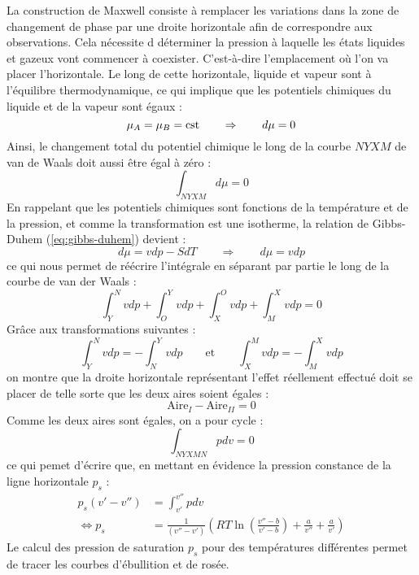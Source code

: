 La construction de Maxwell consiste à remplacer les variations dans la zone de changement de phase par une droite horizontale afin de correspondre aux observations. Cela nécessite d déterminer la pression à laquelle les états liquides et gazeux vont commencer à coexister. C'est-à-dire l'emplacement où l'on va placer l'horizontale. Le long de cette horizontale, liquide et vapeur sont à l'équilibre thermodynamique, ce qui implique que les potentiels chimiques du liquide et de la vapeur sont égaux :
\begin{equation} \mu_A = \mu_B = \mathrm{cst} \qquad \Rightarrow \qquad d\mu = 0 \end{equation}
Ainsi, le changement total du potentiel chimique le long de la courbe $NYXM$ de van de Waals doit aussi être égal à zéro :
\begin{equation} \int_{NYXM}d\mu = 0 \end{equation}
En rappelant que les potentiels chimiques sont fonctions de la température et de la pression, et comme la transformation est une isotherme, la relation de Gibbs-Duhem (\ref{eq:gibbs-duhem}) devient :
\begin{equation} d\mu = vdp - SdT \qquad \Rightarrow \qquad d\mu = vdp \end{equation}
ce qui nous permet de réécrire l'intégrale en séparant par partie le long de la courbe de van der Waals :
\begin{equation} \int_Y^Nvdp + \int_O^Yvdp + \int_X^Ovdp + \int_M^Xvdp = 0 \end{equation}
Grâce aux transformations suivantes :
\begin{equation} \int_Y^Nvdp = -\int_N^Yvdp \qquad \text{et} \qquad \int_X^Mvdp = -\int_M^Xvdp \end{equation}
on montre que la droite horizontale représentant l'effet réellement effectué doit se placer de telle sorte que les deux aires soient égales :
\begin{equation} \text{Aire}_{I} - \text{Aire}_{II} = 0 \end{equation}
Comme les deux aires sont égales, on a pour cycle :
\begin{equation} \int_{NYXMN}pdv = 0 \end{equation}
ce qui pemet d'écrire que, en mettant en évidence la pression constance de la ligne horizontale $p_s$ :
\begin{align} p_s(v'-v'') &= \int_{v'}^{v''}pdv \\ \Leftrightarrow p_s &= \frac{1}{(v''-v')}\left(RT\ln\left(\frac{v''-b}{v'-b}\right) + \frac{a}{v''} + \frac{a}{v'}\right) \end{align}
Le calcul des pression de saturation $p_s$ pour des températures différentes permet de tracer les courbes d'ébullition et de rosée. 

